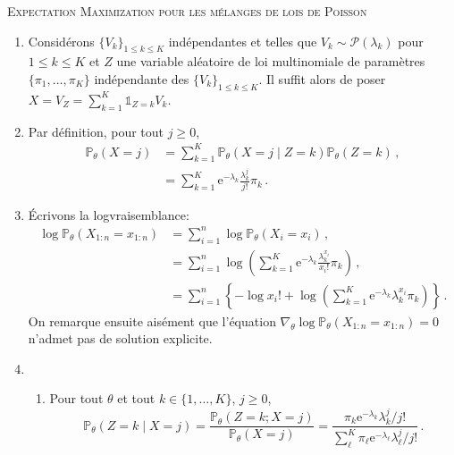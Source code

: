 \documentclass[a4paper,10pt,fleqn]{article}
\newcommand{\1}{\ensuremath{\mathbbm{1}}}
\begin{document}


\noindent\hrulefill

\begin{center}
\textsc{Expectation Maximization pour les m\'elanges de lois de Poisson}
\end{center}
\hrulefill

\medskip

\begin{enumerate}
\item Consid\'erons $\{V_k\}_{1\leq k\leq K}$ ind\'ependantes et telles que $V_k\sim \mathcal{P}(\lambda_k)$ pour $1\leq k\leq K$ et $Z$ une variable al\'eatoire de loi multinomiale de param\`etres $\{\pi_1, \ldots,\pi_K\}$ ind\'ependante des $\{V_k\}_{1\leq k\leq K}$. Il suffit alors de poser $X = V_Z = \sum_{k=1}^K \mathds{1}_{Z=k}V_k$.
\item Par d\'efinition, pour tout $j\geq 0$,
\begin{align*}
\mathbb{P}_\theta\left(X=j\right) &= \sum_{k=1}^K \mathbb{P}_\theta\left(X=j \middle |Z = k\right)\mathbb{P}_\theta\left(Z = k\right)\,,\\
&=  \sum_{k=1}^K \mathrm{e}^{-\lambda_k}\frac{\lambda_k^j}{j!}\pi_k\,.
\end{align*}
\item \'Ecrivons la logvraisemblance:
\begin{align*}
\log \mathbb{P}_\theta\left(X_{1:n}=x_{1:n}\right) &= \sum_{i=1}^n\log \mathbb{P}_\theta\left(X_{i}=x_{i}\right)\,,\\
&=\sum_{i=1}^n\log \left(\sum_{k=1}^K \mathrm{e}^{-\lambda_k}\frac{\lambda_k^{x_i}}{x_i!}\pi_k\right)\,,\\
&=\sum_{i=1}^n\left\{-\log  x_i! + \log \left(\sum_{k=1}^K \mathrm{e}^{-\lambda_k}\lambda_k^{x_i} \pi_k\right)\right\}\,.
\end{align*}
On remarque ensuite ais\'ement que l'\'equation $\nabla_\theta \log \mathbb{P}_\theta\left(X_{1:n}=x_{1:n}\right)  = 0$ n'admet pas de solution explicite.
\item
\begin{enumerate}
\item Pour tout $\theta$ et tout $k\in\{1,\ldots,K\}$, $j\geq 0$,
$$
\mathbb{P}_\theta\left(Z=k\middle|X=j\right) = \frac{\mathbb{P}_\theta\left(Z=k;X=j\right)}{\mathbb{P}_\theta\left(X=j\right)} = \frac{\pi_k \mathrm{e}^{-\lambda_k}\lambda_k^{j}/j!}{\sum_{\ell}^K\pi_\ell \mathrm{e}^{-\lambda_\ell}\lambda_\ell^{j}/j!}\,.
$$
\end{enumerate}
\end{enumerate}
\end{document}
